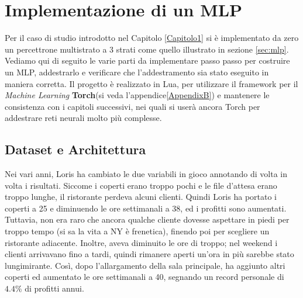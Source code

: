 \chapter{Implementazione di un MLP} %
\label{Capitolo2} %
\def \path {Figures/C1}
\def \teoria {Figures/teoria}
Per il caso di studio introdotto nel Capitolo \ref{Capitolo1} si è implementato da zero un percettrone multistrato a 3 strati come quello illustrato in sezione \ref{sec:mlp}. Vediamo qui di seguito le varie parti da implementare passo passo per costruire un MLP, addestrarlo e verificare che l'addestramento sia stato eseguito in maniera corretta. Il progetto è realizzato in Lua, per utilizzare il framework per il \emph{Machine Learning} \textbf{Torch}(si veda l'appendice\ref{AppendixB}) e mantenere le consistenza con i capitoli successivi, nei quali si userà ancora Torch per addestrare reti neurali molto più complesse.

\section{Dataset e Architettura}
Nei vari anni, Loris ha cambiato le due variabili in gioco annotando di volta in volta i risultati. Siccome i coperti erano troppo pochi e le file d'attesa erano troppo lunghe, il ristorante perdeva alcuni clienti. Quindi Loris ha portato i coperti a 25 e diminuendo le ore settimanali a 38, ed i profitti sono aumentati. Tuttavia, non era raro che ancora qualche cliente dovesse aspettare in piedi per troppo tempo (si sa la vita a NY è frenetica), finendo poi per scegliere un ristorante adiacente. Inoltre, aveva diminuito le ore di troppo; nel weekend i clienti arrivavano fino a tardi, quindi rimanere aperti un'ora in più sarebbe stato lungimirante. Così, dopo l'allargamento della sala principale, ha aggiunto altri coperti ed aumentato le ore settimanali a 40, segnando un record personale di $4.4\%$ di profitti annui. \\


